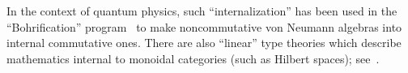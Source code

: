 \documentclass[copyright]{eptcs}
\makeatletter
\newcommand{\type}{\ensuremath{\mathsf{Type}}\xspace}
\def\jd#1{\@jd#1\ej}
\def\@jd#1|-#2\ej{\@@jd#1,,\;\vdash\;\left(#2\right)}
\def\@@jd#1,{\@ifmtarg{#1}{\let\next=\relax}{\left(#1\right)\let\next=\@@@jd}\next}
\def\@@@jd#1,{\@ifmtarg{#1}{\let\next=\relax}{,\,\left(#1\right)\let\next=\@@@jd}\next}
\makeatother
\begin{document}
%
%
%
In the context of quantum physics, such ``internalization'' has been used in the ``Bohrification'' program~\cite{Bohrification} to make noncommutative von Neumann algebras into internal commutative ones.
There are also ``linear'' type theories which describe mathematics internal to monoidal categories (such as Hilbert spaces); see~\cite{Rosetta}.
\end{document}
